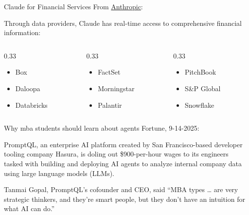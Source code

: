 \documentclass[
  ignorenonframetext,
]{beamer}
\providecommand{\tightlist}{%
  \setlength{\itemsep}{0pt}\setlength{\parskip}{0pt}}
\begin{document}
\begin{frame}{Claude for Financial Services}
\label{claude-for-financial-services}
From
\href{https://www.anthropic.com/news/claude-for-financial-services}{Anthropic}:

Through data providers, Claude has real-time access to comprehensive
financial information:

\begin{columns}[T]
\begin{column}{0.33\linewidth}
\begin{itemize}
\tightlist
\item
  Box
\item
  Daloopa
\item
  Databricks
\end{itemize}
\end{column}

\begin{column}{0.33\linewidth}
\begin{itemize}
\tightlist
\item
  FactSet
\item
  Morningstar
\item
  Palantir
\end{itemize}
\end{column}

\begin{column}{0.33\linewidth}
\begin{itemize}
\tightlist
\item
  PitchBook
\item
  S\&P Global
\item
  Snowflake
\end{itemize}
\end{column}
\end{columns}
\end{frame}

\begin{frame}{Why mba students should learn about agents}
\label{why-mba-students-should-learn-about-agents}
Fortune, 9-14-2025:

PromptQL, an enterprise AI platform created by San Francisco-based
developer tooling company Hasura, is doling out {\$900-per-hour} wages
to its engineers tasked with building and deploying AI agents to analyze
internal company data using large language models (LLMs).

Tanmai Gopal, PromptQL's cofounder and CEO, said ``{MBA types} \ldots{}
are very strategic thinkers, and they're smart people, but they {don't
have an intuition for what AI can do}.''
\end{frame}
\end{document}
